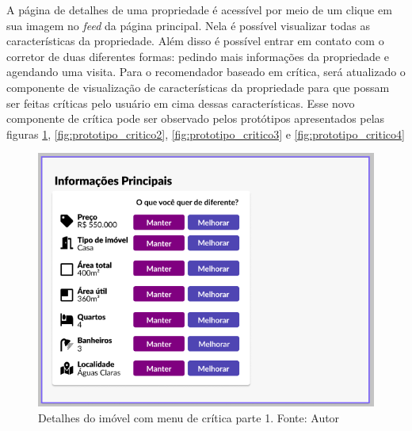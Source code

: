 A página de detalhes de uma propriedade é acessível por meio de um clique em sua imagem no \textit{feed} da página principal. Nela é possível visualizar todas as características da propriedade. Além disso é possível entrar em contato com o corretor de duas diferentes formas: pedindo mais informações da propriedade e agendando uma visita. Para o recomendador baseado em crítica, será atualizado o componente de visualização de características da propriedade para que possam ser feitas críticas pelo usuário em cima dessas características. Esse novo componente de crítica pode ser observado pelos protótipos apresentados pelas figuras \ref{fig:prototipo_critico1}, \ref{fig:prototipo_critico2}, \ref{fig:prototipo_critico3} e \ref{fig:prototipo_critico4}

\begin{figure}[H]
    \centering
    \includegraphics[scale=0.7]{figuras/proposta/prototipo_critico1.png}
    \caption[Detalhes do imóvel com menu de crítica parte 1]{Detalhes do imóvel com menu de crítica parte 1. Fonte: Autor}
    \label{fig:prototipo_critico1}
\end{figure}

